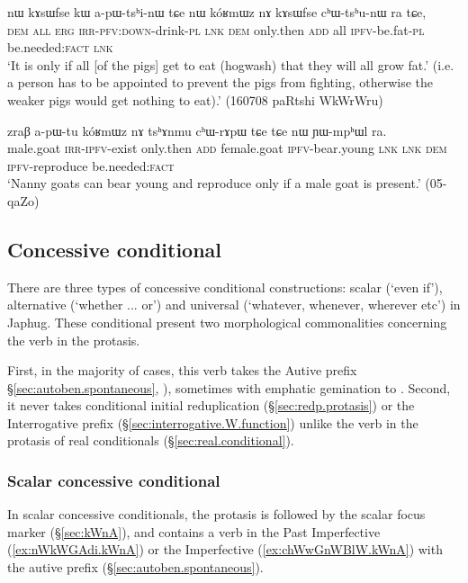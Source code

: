 \begin{exe}
	\ex \label{ex:nWkoRmWznA.only.if}
	\gll nɯ kɤsɯfse kɯ a-pɯ-tsʰi-nɯ tɕe nɯ 	kóʁmɯz nɤ kɤsɯfse cʰɯ-tsʰu-nɯ ra tɕe,  \\
	\textsc{dem} \textsc{all} \textsc{erg} \textsc{irr}-\textsc{pfv}:\textsc{down}-drink-\textsc{pl} \textsc{lnk} \textsc{dem}  only.then \textsc{add} all \textsc{ipfv}-be.fat-\textsc{pl} be.needed:\textsc{fact} \textsc{lnk} \\
	\glt `It is only if all [of the pigs] get to eat (hogwash) that they will all grow fat.' 	(i.e. a person has to be appointed to prevent the pigs from fighting, otherwise the weaker pigs would get nothing to eat).' (160708 paRtshi WkWrWru)
\end{exe}

\begin{exe}
	\ex \label{ex:nWkoRmWznA.only.if2}
	\gll zraβ a-pɯ-tu kóʁmɯz nɤ tsʰɤnmu cʰɯ-rɤpɯ tɕe tɕe nɯ ɲɯ-mpʰɯl ra.\\
	male.goat \textsc{irr}-\textsc{ipfv}-exist only.then \textsc{add} female.goat \textsc{ipfv}-bear.young \textsc{lnk} \textsc{lnk} \textsc{dem} \textsc{ipfv}-reproduce be.needed:\textsc{fact} \\
	\glt `Nanny goats can bear young and reproduce only if a male goat is present.' (05-qaZo)
\end{exe}
 
 \subsection{Concessive conditional} \label{sec:concessive.conditional}
There are three types of concessive conditional constructions: scalar (`even if'), alternative (`whether ... or') and universal (`whatever, whenever, wherever etc') in Japhug. These conditional present two morphological commonalities concerning the verb in the protasis. 

First, in the majority of cases, this verb  takes the Autive prefix   §\ref{sec:autoben.spontaneous}, \citealt[298--300]{jacques14linking}), sometimes with emphatic gemination to . Second, it never takes  conditional initial reduplication (§\ref{sec:redp.protasis}) or the Interrogative prefix (§\ref{sec:interrogative.W.function}) unlike the verb in the protasis of real conditionals (§\ref{sec:real.conditional}).  

 
\subsubsection{Scalar concessive conditional} \label{sec:scalar.concessive.conditional}
In scalar concessive conditionals, the protasis is followed by the scalar focus marker  (§\ref{sec:kWnA}), and contains a verb  in the Past Imperfective (\ref{ex:nWkWGAdi.kWnA}) or the Imperfective (\ref{ex:chWwGnWBlW.kWnA}) with the autive prefix (§\ref{sec:autoben.spontaneous}).
 

